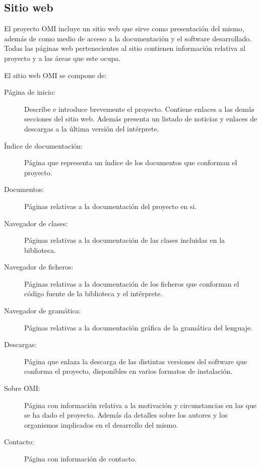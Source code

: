 \subsection{Sitio web}
El proyecto OMI incluye un sitio web que sirve como presentación del mismo, además de como medio de acceso a la documentación 
y el software desarrollado. Todas las páginas web pertenecientes al sitio contienen información relativa al proyecto y a las áreas que este
ocupa. 

El sitio web OMI se compone de: 

\begin{description}
\item [Página de inicio:] Describe e introduce brevemente el proyecto. Contiene enlaces a las demás secciones del sitio web. Además presenta un
listado de noticias y enlaces de descargas a la última versión del intérprete.
\item [Índice de documentación:] Página que representa un índice de los documentos que conforman el proyecto.
\item [Documentos:] Páginas relativas a la documentación del proyecto en si.
\item [Navegador de clases:] Páginas relativas a la documentación de las clases incluidas en la biblioteca. 
\item [Navegador de ficheros:] Páginas relativas a la documentación de los ficheros que conforman 
el código fuente de la biblioteca y el intérprete.
\item [Navegador de gramática:] Páginas relativas a la documentación gráfica de la gramática del lenguaje.
\item [Descargas:] Página que enlaza la descarga de las distintas versiones del software que conforma el proyecto, disponibles en varios formatos de instalación.
\item [Sobre OMI:] Página con información relativa a la motivación y circunstancias en las que se ha dado el proyecto. Además da detalles sobre los autores y los
organismos implicados en el desarrollo del mismo.
\item [Contacto:] Página con información de contacto.
\end{description}


